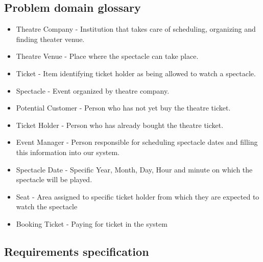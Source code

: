 \documentclass[12pt]{article}
\begin{document}
\subsection{Problem domain glossary}
\begin{itemize}
    \item Theatre Company - Institution that takes care of scheduling, organizing and finding theater venue.
    \item Theatre Venue - Place where the spectacle can take place. 
    \item Ticket - Item identifying ticket holder as being allowed to watch a spectacle.  
    \item Spectacle - Event organized by theatre company. 
    \item Potential Customer  - Person who has not yet buy the theatre ticket.
    \item Ticket Holder - Person who has already bought the theatre ticket. 
    \item Event Manager - Person responsible for scheduling spectacle dates and filling this information into our system. 
    \item Spectacle Date - Specific Year, Month, Day, Hour and minute on which the spectacle will be played. 
    \item Seat - Area assigned to specific ticket holder from which they are expected to watch the spectacle 
    \item Booking Ticket - Paying for ticket in the system
\end{itemize}

\subsection{Requirements specification}
\end{document}
